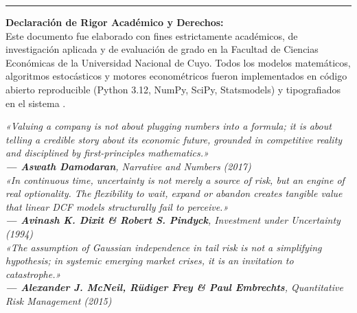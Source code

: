\documentclass[10pt,a4paper]{article}
\theoremstyle{definition}
\begin{document}
\begin{tcolorbox}[colback=white, colframe=primary, boxrule=0.8pt, sharp corners, width=\linewidth, top=4mm, bottom=4mm, left=4mm, right=4mm]
\vspace{0.3cm}
\hrule
\vspace{0.3cm}

\textbf{Declaración de Rigor Académico y Derechos:}\\[0.1cm]
\footnotesize
Este documento fue elaborado con fines estrictamente académicos, de investigación aplicada y de evaluación de grado en la Facultad de Ciencias Económicas de la Universidad Nacional de Cuyo. Todos los modelos matemáticos, algoritmos estocásticos y motores econométricos fueron implementados en código abierto reproducible (Python 3.12, NumPy, SciPy, Statsmodels) y tipografiados en el sistema \XeLaTeX{}.
\end{tcolorbox}
\vspace*{0.5cm}

\clearpage
\thispagestyle{empty}

\vspace*{2.0cm}
\begin{flushright}
    \begin{minipage}{0.75\linewidth}
        \itshape\small
        «Valuing a company is not about plugging numbers into a formula; it is about telling a credible story about its economic future, grounded in competitive reality and disciplined by first-principles mathematics.»\\[0.2cm]
        \normalfont\small\textbf{--- Aswath Damodaran}, \textit{Narrative and Numbers} (2017)\\[1.2cm]
        
        \itshape\small
        «In continuous time, uncertainty is not merely a source of risk, but an engine of real optionality. The flexibility to wait, expand or abandon creates tangible value that linear DCF models structurally fail to perceive.»\\[0.2cm]
        \normalfont\small\textbf{--- Avinash K. Dixit \& Robert S. Pindyck}, \textit{Investment under Uncertainty} (1994)\\[1.2cm]
        
        \itshape\small
        «The assumption of Gaussian independence in tail risk is not a simplifying hypothesis; in systemic emerging market crises, it is an invitation to catastrophe.»\\[0.2cm]
        \normalfont\small\textbf{--- Alexander J. McNeil, Rüdiger Frey \& Paul Embrechts}, \textit{Quantitative Risk Management} (2015)
    \end{minipage}
\end{flushright}
\end{document}
